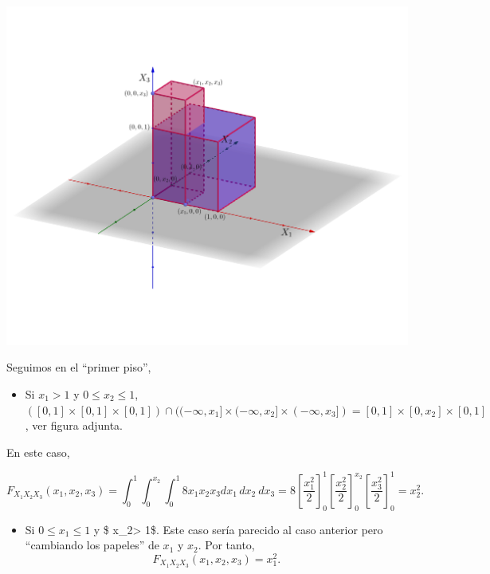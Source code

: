 \documentclass[]{book}
\providecommand{\tightlist}{%
  \setlength{\itemsep}{0pt}\setlength{\parskip}{0pt}}
\begin{document}
\includegraphics{Images/Fx1x2x3piso.png}

Seguimos en el ``primer piso'',

\begin{itemize}
\tightlist
\item
  Si \(x_1 >1\) y \(0\leq x_2\leq 1\), \(([0,1]\times [0,1]\times [0,1])\cap ((-\infty,x_1]\times (-\infty,x_2]\times (-\infty,x_3])=[0,1]\times [0,x_2]\times [0,1]\), ver figura adjunta.
\end{itemize}

En este caso,

\[
F_{X_1X_2X_3}(x_1,x_2,x_3)=\int_{0}^{1}\int_{0}^{x_2}\int_{0}^{1} 8 x_1 x_2 x_3 dx_1\, dx_2\ dx_3 = 
8\left[\frac{x_1^2}{2}\right]_0^{1}\left[\frac{x_2^2}{2}\right]_0^{x_2}\left[\frac{x_3^2}{2}\right]_0^{1} = x_2^2.
\]

\begin{itemize}
\tightlist
\item
  Si \(0\leq x_1 \leq 1\) y \$ x\_2\textgreater{} 1\$. Este caso sería parecido al caso anterior pero ``cambiando los papeles'' de \(x_1\) y \(x_2\).
  Por tanto,
  \[
  F_{X_1X_2X_3}(x_1,x_2,x_3)=x_1^2.
  \]
\end{itemize}
\end{document}

